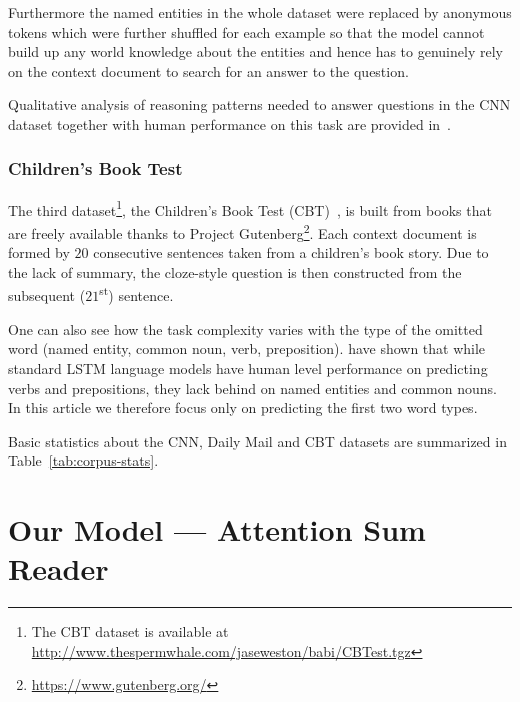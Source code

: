 \documentclass[11pt]{article}
\newcommand{\RUDAA}[1]{{\color{black}#1}}
\begin{document}
Furthermore the named entities in the whole dataset were replaced by anonymous tokens which were further shuffled for each example so that the model cannot build up any world knowledge about the entities and hence has to genuinely rely on the context document to search for an answer to the question.

\RUDAA{
Qualitative analysis of reasoning patterns needed to answer questions in the CNN dataset together with human performance on this task are provided in~\cite{chen2016thorough}.
}

\subsubsection{Children's Book Test}
The third dataset\footnote{The CBT dataset is available at \url{http://www.thespermwhale.com/jaseweston/babi/CBTest.tgz}}, the Children's Book Test (CBT)~\cite{hill2015goldilocks}, is built from books that are freely available 
thanks to Project Gutenberg\footnote{\url{https://www.gutenberg.org/}}.
Each context document is formed by $20$ consecutive sentences taken from a children's book story.
Due to the lack of summary, the cloze-style question is then constructed from the subsequent ($21$\textsuperscript{st}) sentence.

One can also see how the task complexity varies with the type of the omitted word (named entity, common noun, verb, preposition). 
\cite{hill2015goldilocks} have shown that while standard LSTM language models have human level performance on predicting verbs and prepositions,
they lack behind on named entities and common nouns. In this article we therefore focus only on predicting the first two word types. %


Basic statistics about the CNN, Daily Mail and CBT datasets are summarized in Table~\ref{tab:corpus-stats}.


\vspace{10pt} %

\section{Our Model --- Attention Sum Reader}
\end{document}
